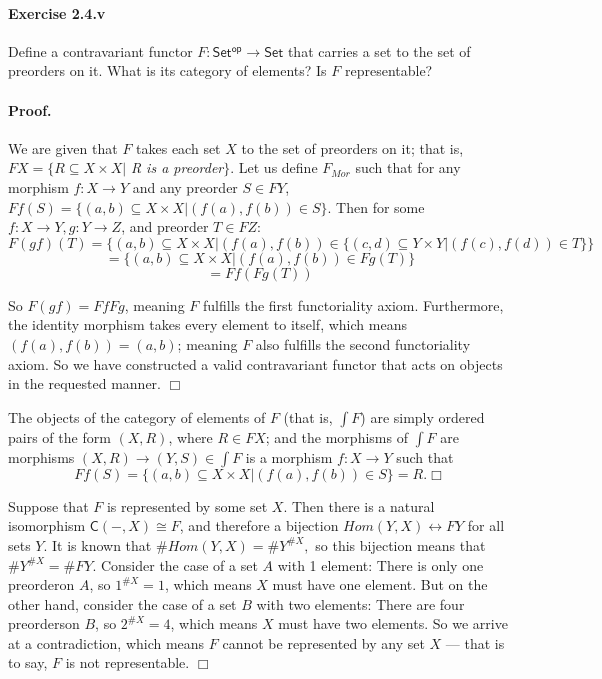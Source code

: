 \documentclass[main.tex]{subfiles}
\begin{document}
	\paragraph{Exercise 2.4.v} Define a contravariant functor $ F \colon \mathsf{Set^{op}} \to \mathsf{Set} $ that carries a set to the set of preorders on it. What is its category of elements? Is $ F $ representable?	
	
	\paragraph{Proof.} We are given that $ F $ takes each set $ X $ to the set of preorders on it; that is, $FX = \{R \subseteq X \times X | $ \textit{R is a preorder}$ \} $. Let us define $ F_{Mor} $ such that for any morphism $ f: X \to Y $ and any preorder $ S \in FY $, $ Ff(S) = \{(a,b) \subseteq X \times X | (f(a), f(b)) \in S\} $. Then for some $ f: X \to Y, g: Y \to Z $, and preorder $ T \in FZ $:	
	\[F(gf)(T) = \{(a,b) \subseteq X \times X | (f(a), f(b)) \in \{(c,d) \subseteq Y \times Y | (f(c), f(d)) \in T\}\}\] 
	\[\!\!\!\!\!\!\!\!\!\!\!\!\!\!\!\!\!\!\!\!\!\!\!\!\!\!\!\!\!\!\!\!\!\!\!\!\!\!\!\!\!\!\!\!\!
	= \{(a,b) \subseteq X \times X | (f(a), f(b)) \in Fg(T)\}\] \[\!\!\!\!\!\!\!\!\!\!\!\!\!\!\!\!\!\!\!\!\!\!\!\!\!\!\!\!\!\!\!\!\!\!\!\!\!\!\!\!\!\!\!\!\!\!\!\!\!\!\!\!\!\!\!\!\!\!\!\!\!\!\!\!\!\!\!\!\!\!\!\!\!\!\!\!\!\!\!\!\!\!\!\!\!\!\!\!\!\!\!\!\!\!\!\!\!\!\!\!\!\!\!\!\!\!\!\!\!\!\!\!\!\!\!\!
	= Ff(Fg(T)) \]
	
		
	\noindent So $ F(gf) = FfFg $, meaning $ F $ fulfills the first functoriality axiom. Furthermore, the identity morphism takes every element to itself, which means $ (f(a), f(b)) = (a, b) $; meaning $ F $ also fulfills the second functoriality axiom. So we have constructed a valid contravariant functor that acts on objects in the requested manner. $ \Box $
	
	The objects of the category of elements of $ F $ (that is, $ \int F $) are simply ordered pairs of the form $ (X, R) $, where $ R \in FX $; and the morphisms of $ \int F $ are morphisms $ (X, R) \to (Y, S) \in \int F $ is a morphism $ f: X \to Y $ such that \[Ff(S) = \{(a,b) \subseteq X \times X | (f(a), f(b)) \in S\} = R. \Box \]
	
	Suppose that $ F $ is represented by some set $ X $. Then there is a natural isomorphism $ \mathsf{C}(-,X) \cong F $, and therefore a bijection $ Hom(Y, X) \leftrightarrow FY $ for all sets $ Y $. It is known that $ \#Hom(Y, X) = \#Y^{\#X}, $ so this bijection means that $ \#Y^{\#X} = \#FY $. Consider the case of a set $ A $ with 1 element: There is only one preorder\footnotemark[1] on $ A $, so $ 1^{\#X} = 1 $, which means $ X $ must have one element. But on the other hand, consider the case of a set $ B $ with two elements: There are four preorders\footnotemark[2] on $ B $, so $ 2^{\#X} = 4 $, which means $ X $ must have two elements. So we arrive at a contradiction, which means $ F $ cannot be represented by any set $ X $ --- that is to say, $ F $ is not representable. $ \Box $
	
\end{document}
